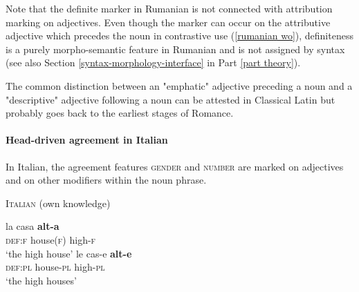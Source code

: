 Note that the definite marker in Rumanian is not connected with attribution marking on adjectives. Even though the marker can occur on the attributive adjective which precedes the noun in contrastive use (\ref{rumanian wo}), definiteness is a purely morpho-semantic feature in Rumanian and is not assigned by syntax (see also Section \ref{syntax-morphology-interface} in Part \ref{part theory}).

The common distinction between an "emphatic" adjective preceding a noun and a "descriptive" adjective following a noun can be attested in Classical Latin \cite[146]{posner1996} but probably goes back to the earliest stages of Romance.

\paragraph{Head-driven agreement in Italian} 
In Italian, the agreement features \textsc{gender} and \textsc{number} are marked on adjectives and on other modifiers within the noun phrase.
\begin{exe}
\ex \textsc{Italian} (own knowledge)
\begin{xlist}
\ex
\gll	la casa \textbf{alt-a}\\
	\textsc{def:f} house(\textsc{f}) high-\textsc{f}\\
\glt	‘the high house’
\ex
\gll	le cas-e \textbf{alt-e}\\
	\textsc{def:pl} house-\textsc{pl} high-\textsc{pl}\\
\glt	‘the high houses’
\end{xlist}
\end{exe}

